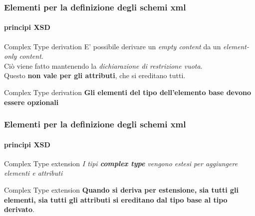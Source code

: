 \begin{frame}
	\frametitle{Elementi per la definizione degli schemi xml}
	\framesubtitle{principi XSD}
	\addtocounter{nframe}{1}

	\begin{block}{Complex Type derivation}
		E' possibile derivare un \textit{empty content} da un\textit{ element-only content}. 
		\\Ciò viene fatto mantenendo la \textit{dichiarazione di restrizione vuota}. 
		\\Questo \textbf{non vale per gli attributi}, che si ereditano tutti.
	\end{block}

	\begin{block}{Complex Type derivation}
		\textbf{Gli elementi del tipo dell'elemento base devono essere opzionali}
	\end{block}
\end{frame}


\begin{frame}
	\frametitle{Elementi per la definizione degli schemi xml}
	\framesubtitle{principi XSD}
	\addtocounter{nframe}{1}

	\begin{block}{Complex Type extension}
		\textit{I tipi \textbf{complex type} vengono estesi per aggiungere elementi e attributi}
	\end{block}

	\begin{block}{Complex Type extension}
		\textbf{Quando si deriva per estensione, sia tutti gli elementi, sia tutti gli attributi si ereditano dal tipo base al tipo derivato}.
	\end{block}
\end{frame}


%   
%  
%

